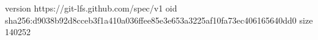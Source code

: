 version https://git-lfs.github.com/spec/v1
oid sha256:d9038b92d8cceb3f1a410a036ffee85e3e653a3225af10fa73ec406165640dd0
size 140252
